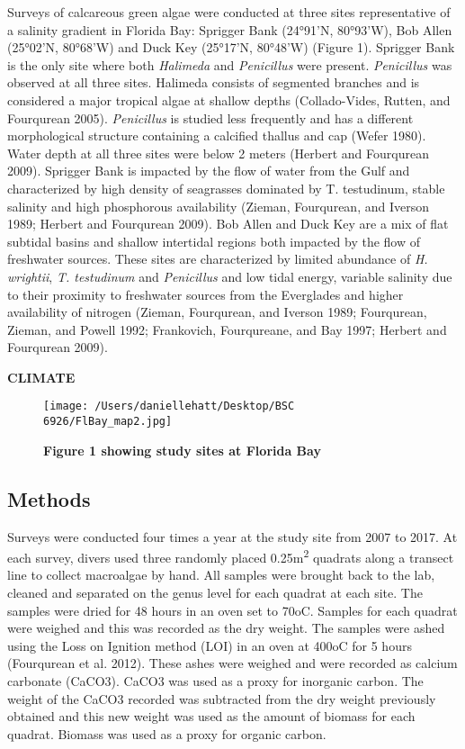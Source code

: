 \documentclass[]{article}
\begin{document}
Surveys of calcareous green algae were conducted at three sites
representative of a salinity gradient in Florida Bay: Sprigger Bank
(24°91'N, 80°93'W), Bob Allen (25°02'N, 80°68'W) and Duck Key (25°17'N,
80°48'W) (Figure 1). Sprigger Bank is the only site where both
\emph{Halimeda} and \emph{Penicillus} were present. \emph{Penicillus}
was observed at all three sites. Halimeda consists of segmented branches
and is considered a major tropical algae at shallow depths
(Collado-Vides, Rutten, and Fourqurean 2005). \emph{Penicillus} is
studied less frequently and has a different morphological structure
containing a calcified thallus and cap (Wefer 1980). Water depth at all
three sites were below 2 meters (Herbert and Fourqurean 2009). Sprigger
Bank is impacted by the flow of water from the Gulf and characterized by
high density of seagrasses dominated by T. testudinum, stable salinity
and high phosphorous availability (Zieman, Fourqurean, and Iverson 1989;
Herbert and Fourqurean 2009). Bob Allen and Duck Key are a mix of flat
subtidal basins and shallow intertidal regions both impacted by the flow
of freshwater sources. These sites are characterized by limited
abundance of \emph{H. wrightii}, \emph{T. testudinum} and
\emph{Penicillus} and low tidal energy, variable salinity due to their
proximity to freshwater sources from the Everglades and higher
availability of nitrogen (Zieman, Fourqurean, and Iverson 1989;
Fourqurean, Zieman, and Powell 1992; Frankovich, Fourqureane, and Bay
1997; Herbert and Fourqurean 2009).

\textbf{CLIMATE}

\begin{figure}
\centering
\texttt{[image: /Users/daniellehatt/Desktop/BSC 6926/FlBay\_map2.jpg]}
\caption{\textbf{Figure 1 showing study sites at Florida Bay}}
\end{figure}

\hypertarget{methods-1}{%
\subsection{Methods}\label{methods-1}}

Surveys were conducted four times a year at the study site from 2007 to
2017. At each survey, divers used three randomly placed
0.25m\textsuperscript{2} quadrats along a transect line to collect
macroalgae by hand. All samples were brought back to the lab, cleaned
and separated on the genus level for each quadrat at each site. The
samples were dried for 48 hours in an oven set to 70oC. Samples for each
quadrat were weighed and this was recorded as the dry weight. The
samples were ashed using the Loss on Ignition method (LOI) in an oven at
400oC for 5 hours (Fourqurean et al. 2012). These ashes were weighed and
were recorded as calcium carbonate (CaCO3). CaCO3 was used as a proxy
for inorganic carbon. The weight of the CaCO3 recorded was subtracted
from the dry weight previously obtained and this new weight was used as
the amount of biomass for each quadrat. Biomass was used as a proxy for
organic carbon.
\end{document}
